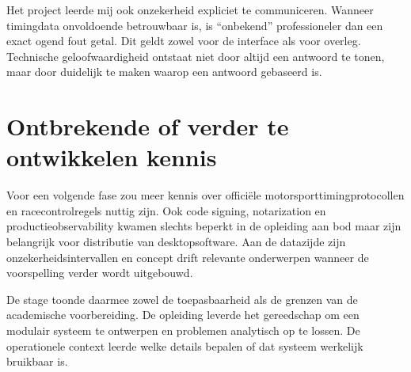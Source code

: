 Het project leerde mij ook onzekerheid expliciet te communiceren. Wanneer timingdata onvoldoende betrouwbaar is, is ``onbekend'' professioneler dan een exact ogend fout getal. Dit geldt zowel voor de interface als voor overleg. Technische geloofwaardigheid ontstaat niet door altijd een antwoord te tonen, maar door duidelijk te maken waarop een antwoord gebaseerd is.

\section{Ontbrekende of verder te ontwikkelen kennis}
Voor een volgende fase zou meer kennis over officiële motorsporttimingprotocollen en racecontrolregels nuttig zijn. Ook code signing, notarization en productieobservability kwamen slechts beperkt in de opleiding aan bod maar zijn belangrijk voor distributie van desktopsoftware. Aan de datazijde zijn onzekerheidsintervallen en concept drift relevante onderwerpen wanneer de voorspelling verder wordt uitgebouwd.

De stage toonde daarmee zowel de toepasbaarheid als de grenzen van de academische voorbereiding. De opleiding leverde het gereedschap om een modulair systeem te ontwerpen en problemen analytisch op te lossen. De operationele context leerde welke details bepalen of dat systeem werkelijk bruikbaar is.

